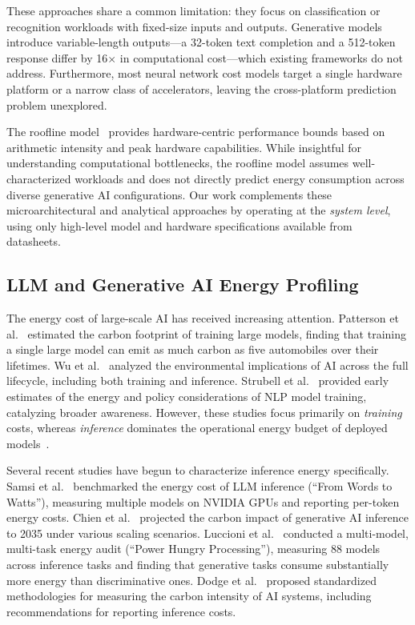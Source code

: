 \documentclass{ieeeaccess}
\begin{document}
These approaches share a common limitation: they focus on classification or recognition workloads with fixed-size inputs and outputs.
Generative models introduce variable-length outputs---a 32-token text completion and a 512-token response differ by 16$\times$ in computational cost---which existing frameworks do not address.
Furthermore, most neural network cost models target a single hardware platform or a narrow class of accelerators, leaving the cross-platform prediction problem unexplored.

The roofline model~\cite{williams2009roofline} provides hardware-centric performance bounds based on arithmetic intensity and peak hardware capabilities.
While insightful for understanding computational bottlenecks, the roofline model assumes well-characterized workloads and does not directly predict energy consumption across diverse generative AI configurations.
Our work complements these microarchitectural and analytical approaches by operating at the \emph{system level}, using only high-level model and hardware specifications available from datasheets.

\subsection{LLM and Generative AI Energy Profiling}
\label{sec:rw_energy_profiling}

The energy cost of large-scale AI has received increasing attention.
Patterson et al.~\cite{patterson2021carbon} estimated the carbon footprint of training large models, finding that training a single large model can emit as much carbon as five automobiles over their lifetimes.
Wu et al.~\cite{wu2022sustainable} analyzed the environmental implications of AI across the full lifecycle, including both training and inference.
Strubell et al.~\cite{strubell2019energy} provided early estimates of the energy and policy considerations of NLP model training, catalyzing broader awareness.
However, these studies focus primarily on \emph{training} costs, whereas \emph{inference} dominates the operational energy budget of deployed models~\cite{desislavov2023trends}.

Several recent studies have begun to characterize inference energy specifically.
Samsi et al.~\cite{samsi2023words} benchmarked the energy cost of LLM inference (``From Words to Watts''), measuring multiple models on NVIDIA GPUs and reporting per-token energy costs.
Chien et al.~\cite{chien2023reducing} projected the carbon impact of generative AI inference to 2035 under various scaling scenarios.
Luccioni et al.~\cite{luccioni2024power} conducted a multi-model, multi-task energy audit (``Power Hungry Processing''), measuring 88 models across inference tasks and finding that generative tasks consume substantially more energy than discriminative ones.
Dodge et al.~\cite{dodge2022measuring} proposed standardized methodologies for measuring the carbon intensity of AI systems, including recommendations for reporting inference costs.
\end{document}
